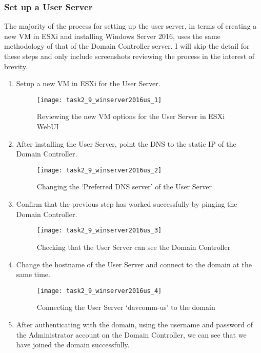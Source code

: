 \subsubsection{Set up a User Server}
The majority of the process for setting up the user server, in terms of creating a new VM in ESXi and installing Windows Server 2016, uses the same methodology of that of the Domain Controller server. I will skip the detail for these steps and only include screenshots reviewing the process in the interest of brevity.
\begin{enumerate}[series=task2methodology4]
  \item Setup a new VM in ESXi for the User Server.
    \begin{figure}[H]
      \centering
      \captionsetup{skip=2pt}
      \texttt{[image: task2\_9\_winserver2016us\_1]}
      \caption{Reviewing the new VM options for the User Server in ESXi WebUI}
      \label{fig:task2:vspherec_us1}
    \end{figure}
  \item After installing the User Server, point the DNS to the static IP of the Domain Controller.
    \begin{figure}[H]
      \centering
      \captionsetup{skip=2pt}
      \texttt{[image: task2\_9\_winserver2016us\_2]}
      \caption{Changing the `Preferred DNS server' of the User Server}
      \label{fig:task2:vspherec_us2}
    \end{figure}
  \item Confirm that the previous step has worked successfully by pinging the Domain Controller.
    \begin{figure}[H]
      \centering
      \captionsetup{skip=2pt}
      \texttt{[image: task2\_9\_winserver2016us\_3]}
      \caption{Checking that the User Server can see the Domain Controller}
      \label{fig:task2:vspherec_us3}
    \end{figure}
  \item Change the hostname of the User Server and connect to the domain at the same time.
    \begin{figure}[H]
      \centering
      \captionsetup{skip=2pt}
      \texttt{[image: task2\_9\_winserver2016us\_4]}
      \caption{Connecting the User Server `davcomm-us' to the domain}
      \label{fig:task2:vspherec_us4}
    \end{figure}
  \item After authenticating with the domain, using the username and password of the Administrator account on the Domain Controller, we can see that we have joined the domain successfully.

\end{enumerate}
